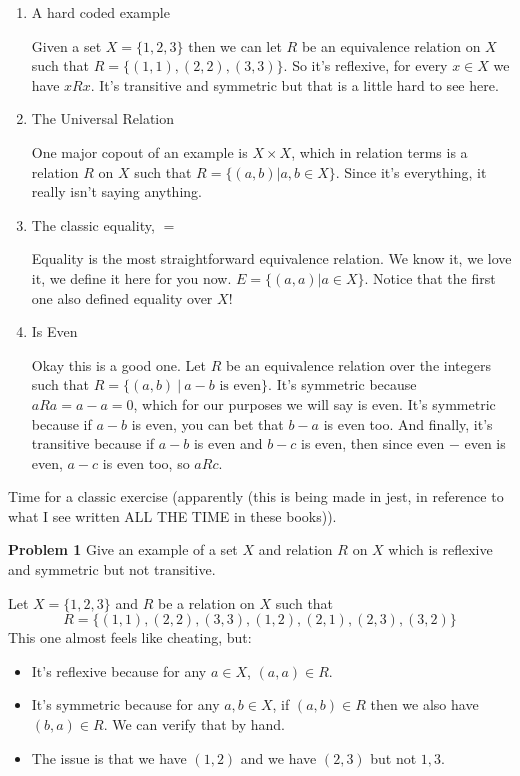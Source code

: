 \begin{enumerate}
    \item A hard coded example

          Given a set \(X = \{1,2,3\}\) then we can let \(R\) be an equivalence relation on \(X\) such that \(R = \{ (1,1), (2,2), (3,3)\}\). So it's reflexive, for every \(x \in X\) we have \(xRx\). It's transitive and symmetric but that is a little hard to see here.

    \item The Universal Relation

          One major copout of an example is \(X \times X\), which in relation terms is a relation \(R\) on \(X\) such that \(R = \{(a,b) | a, b \in X\}\). Since it's everything, it really isn't saying anything.

    \item The classic equality, \(=\)

          Equality is the most straightforward equivalence relation. We know it, we love it, we define it here for you now. \(E = \{(a,a) | a \in X\}\). Notice that the first one also defined equality over \(X\)!

    \item Is Even

          Okay this is a good one. Let \(R\) be an equivalence relation over the integers such that \(R = \{(a,b)\ |\ a-b\text{ is even}\}\). It's symmetric because \(aRa = a -a = 0\), which for our purposes we will say is even. It's symmetric because if \(a - b\) is even, you can bet that \(b - a\) is even too. And finally, it's transitive because if \(a-b\) is even and \(b - c \) is even, then since even \(-\) even is even, \(a - c\) is even too, so \(aRc\).
\end{enumerate}

Time for a classic exercise (apparently (this is being made in jest, in reference to what I see written ALL THE TIME in these books)).

\textbf{Problem 1} Give an example of a set \(X\) and relation \(R\) on \(X\) which is reflexive and symmetric but not transitive.

Let \(X = \{1,2,3\}\) and \(R\) be a relation on \(X\) such that \[R = \{(1,1), (2,2), (3,3), (1,2), (2,1), (2,3), (3,2)\}\]
This one almost feels like cheating, but:
\begin{itemize}
    \item It's reflexive because for any \(a \in X\), \((a,a) \in R\).
    \item It's symmetric because for any \(a, b \in X\), if \((a, b) \in R\) then we also have \((b,a) \in R\). We can verify that by hand.
    \item The issue is that we have \((1,2)\) and we have \((2,3)\) but not \(1,3\).
\end{itemize}


